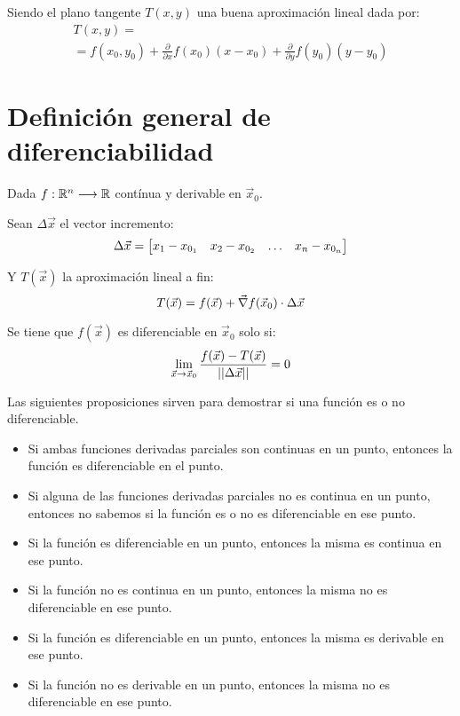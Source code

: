 Siendo el plano tangente $T(x,y)$ una buena aproximación lineal dada por:
\begin{multline*}
    T(x,y) =
    \\
    = f(x_0,y_0) + \frac{\partial}{\partial x} f(x_0) \left(x-x_0\right) + \frac{\partial}{\partial y} f(y_0) \left(y-y_0\right)
\end{multline*}


\section{Definición general de diferenciabilidad}

Dada $f:\mathbb{R}^n \longrightarrow \mathbb{R}$ contínua y derivable en $\Vec{x}_0$.

Sean $\Delta \Vec{x}$ el vector incremento:
\begin{equation*}
    \Delta \Vec{x} = \begin{bmatrix} x_1-x_{0_1} & x_2-x_{0_2} & \dots & x_n-x_{0_n} \end{bmatrix}
\end{equation*}

Y $T(\Vec{x})$ la aproximación lineal a fin:
\begin{equation*}
    T(\Vec{x}) = f(\Vec{x}) + \Vec{\nabla} f(\Vec{x}_0) \cdot \Delta \Vec{x}
\end{equation*}

Se tiene que $f(\Vec{x})$ es diferenciable en $\Vec{x}_0$ solo si:
\begin{equation*}
    \lim_{\Vec{x} \to \Vec{x}_0} \frac{f(\Vec{x})-T(\Vec{x})}{{\left|\left| {\Delta \Vec{x}} \right|\right|}} = 0
\end{equation*}

Las siguientes proposiciones sirven para demostrar si una función es o no diferenciable.

\begin{itemize}
    \item Si ambas funciones derivadas parciales son continuas en un punto, entonces la función es diferenciable en el punto.
    \item Si alguna de las funciones derivadas parciales no es continua en un punto, entonces no sabemos si la función es o no es diferenciable en ese punto.
    \item Si la función es diferenciable en un punto, entonces la misma es continua en ese punto.
    \item Si la función no es continua en un punto, entonces la misma no es diferenciable en ese punto.
    \item Si la función es diferenciable en un punto, entonces la misma es derivable en ese punto.
    \item Si la función no es derivable en un punto, entonces la misma no es diferenciable en ese punto.
\end{itemize}

